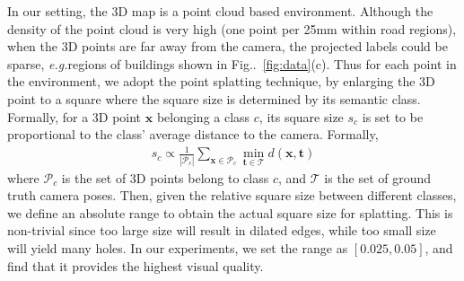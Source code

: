 \documentclass[10pt,twocolumn,letterpaper]{article}
\makeatletter
\newcommand{\figref}[1]{Fig\onedot~\ref{#1}}
\newcommand{\ve}[1]{{\mathbf #1}} %
\newcommand{\hua}[1]{{\mathcal #1}}
\DeclareRobustCommand\onedot{\futurelet\@let@token\@onedot}
\def\onedot{\ifx\@let@token.\else.\null\fi\xspace}
\def\eg{\emph{e.g.}}
\makeatother
\begin{document}
In our setting, the 3D map is a point cloud based environment. 
Although the density of the point cloud is very high (one point per 25mm within road regions), when the 3D points are far away from the camera, the projected labels could be sparse, \eg regions of buildings shown in \figref{fig:data}(c).
Thus for each point in the environment, we adopt the point splatting technique, by enlarging the 3D point to a square where the square size is determined by its semantic class. Formally, for a 3D point $\ve{x}$ belonging a class $c$, its square size $s_c$ is set to be proportional to the class' average distance to the camera. Formally,
{\vspace{-0.3\baselineskip}
\begin{align}
\label{eq:square_size}
s_c \propto \frac{1}{|\hua{P}_c|}\sum_{\ve{x}\in \hua{P}_c} \min_{\ve{t}\in\hua{T}} d(\ve{x}, \ve{t})
\end{align}
}
where $\hua{P}_c$ is the set of 3D points belong to class $c$, and $\hua{T}$ is the set of ground truth camera poses. 
Then, given the relative square size between different classes, we define an absolute range to obtain the actual square size for splatting. This is non-trivial since too large size will result in dilated edges, while too small size will yield many holes. In our experiments, we set the range as $[0.025, 0.05]$, and find that it provides the highest visual quality.
\end{document}
